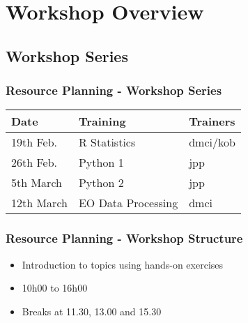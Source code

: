 \section{Workshop Overview} 



\subsection{Workshop Series}
\begin{frame}
\frametitle{Resource Planning - Workshop Series}


\begin{table}[]
\begin{tabular}{lll}
Date 		& Training  	& Trainers  \\
\hline
19th Feb. 	& R Statistics  & dmci/kob   \\
26th Feb. 	& Python 1  	& jpp   \\
5th March 	& Python 2 	& jpp \\
12th March	& EO Data Processing & dmci \\
\hline
\end{tabular}
\end{table}

\end{frame}

\begin{frame}
\frametitle{Resource Planning - Workshop Structure}
\begin{itemize}
	\item Introduction to topics using hands-on exercises
	\item 10h00 to 16h00
	\item Breaks at 11.30, 13.00 and 15.30
\end{itemize}
\end{frame}

